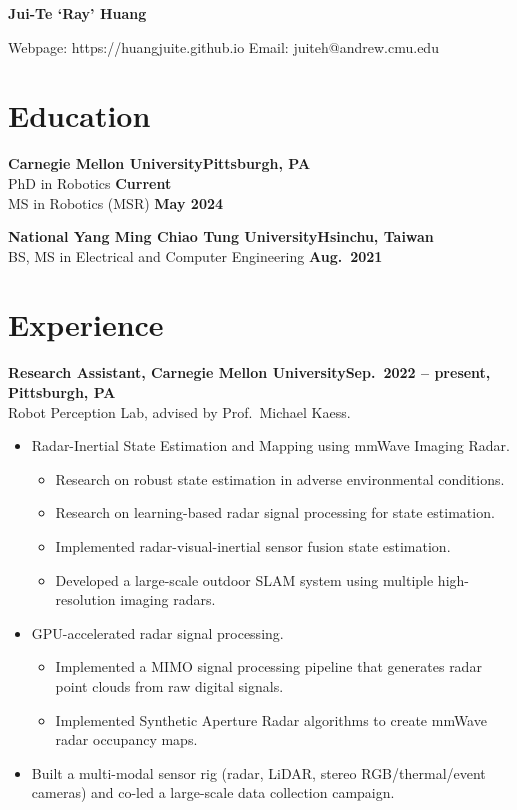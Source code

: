 \documentclass[11pt]{article}
\newcommand{\entry}[2]{\textbf{#1}\hfill\textbf{#2}\\}
\begin{document}
\begin{center}
  {\LARGE\bfseries Jui-Te `Ray' Huang}
\end{center}
\vspace{-0.3em}
Webpage: https://huangjuite.github.io
\hfill
Email: juiteh@andrew.cmu.edu

\section{Education}
\entry{Carnegie Mellon University}{Pittsburgh, PA}
PhD in Robotics \hfill \textbf{Current}\\
MS in Robotics (MSR) \hfill \textbf{May 2024}

\medskip
\entry{National Yang Ming Chiao Tung University}{Hsinchu, Taiwan}
BS, MS in Electrical and Computer Engineering \hfill \textbf{Aug.\ 2021}

\section{Experience}
\entry{Research Assistant, Carnegie Mellon University}{Sep.\ 2022 -- present, Pittsburgh, PA}
Robot Perception Lab, advised by Prof.\ Michael Kaess.
\begin{itemize}
  \item Radar-Inertial State Estimation and Mapping using mmWave Imaging Radar.
  \begin{itemize}
    \item Research on robust state estimation in adverse environmental conditions.
    \item Research on learning-based radar signal processing for state estimation.
    \item Implemented radar-visual-inertial sensor fusion state estimation.
    \item Developed a large-scale outdoor SLAM system using multiple high-resolution imaging radars.
  \end{itemize}
  \item GPU-accelerated radar signal processing.
  \begin{itemize}
    \item Implemented a MIMO signal processing pipeline that generates radar point clouds from raw digital signals.
    \item Implemented Synthetic Aperture Radar algorithms to create mmWave radar occupancy maps.
  \end{itemize}
  \item Built a multi-modal sensor rig (radar, LiDAR, stereo RGB/thermal/event cameras) and co-led a large-scale data collection campaign.
\end{itemize}
\end{document}
